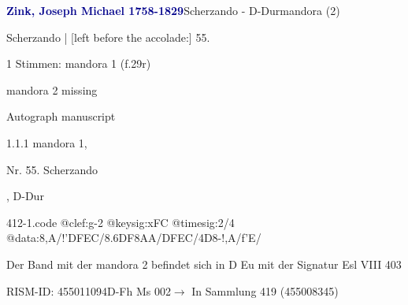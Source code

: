 \documentclass[twocolumn]{book}
\begin{document}
\par \vspace{7pt} \textcolor{darkblue}{\textbf{Zink, Joseph Michael  1758-1829}}\hfillplus{\textbf{[412]}}\newline Scherzando - D-Dur\newline mandora (2)
\par \begin{itshape}[f.29r, at left:] Scherzando | [left before the accolade:] 55.\end{itshape} 
\par \textcolor{darkblue}{}  1 Stimmen: mandora 1  (f.29r)\newline \begin{small} mandora 2 missing\end{small} \newline Autograph manuscript
\par 1.1.1  mandora 1, \begin{itshape}Nr. 55. Scherzando\end{itshape}, D-Dur  
\begin{filecontents*}{412-1.code}
@clef:g-2
@keysig:xFC
@timesig:2/4
@data:8,A/!'DFEC/{8.6DF}8AA/DFEC/4D8-!,A/f'E/
\end{filecontents*}
\newline
%
\par Der Band mit der mandora 2 befindet sich in D Eu mit der Signatur Esl VIII 403
\par RISM-ID: 455011094\newline D-Fh  Ms 002\newline $\rightarrow$ In Sammlung 419 (455008345)
      
\end{document}
